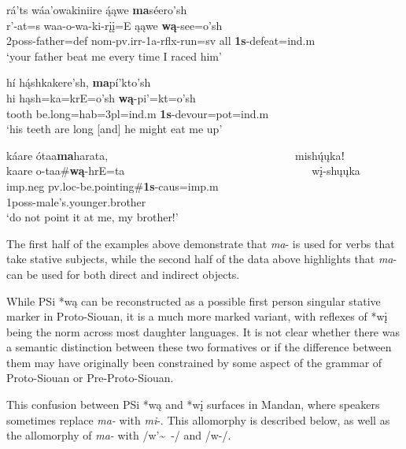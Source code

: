 \begin{exe}
\begin{xlist}
	\item \glll rá'ts wáa'owakiniire ą́ąwe \textbf{ma}séero'sh\\
	r'-at=s waa-o-wa-ki-rįį=E ąąwe \textbf{wą}-see=o'sh\\
	2poss-\textnormal{father}=def nom-pv.irr-1a-rflx-\textnormal{run}=sv \textnormal{all} \textbf{1s}-\textnormal{defeat}=ind.m\\
	\glt `your father beat me every time I raced him' \citep[124]{hollow1973a}
	
	\item \glll hí hą́shkakere'sh, \textbf{ma}pí'kto'sh\\
	hi hąsh=ka=krE=o'sh \textbf{wą}-pi'=kt=o'sh\\
	\textnormal{tooth} \textnormal{be.long}=hab=3pl=ind.m \textbf{1s}-\textnormal{devour}=pot=ind.m\\
	\glt `his teeth are long [and] he might eat me up' \citep[143]{hollow1973a}
	
	\item \glll káare ótaa\textbf{ma}harata, ~ ~ ~ ~ ~ ~ ~ ~ ~ ~ ~ ~ ~ ~ ~ ~ ~ ~ ~ ~ mishų́ųkaǃ\\
	kaare o-taa\#\textbf{wą}-hrE=ta ~ ~ ~ ~ ~ ~ ~ ~ ~ ~ ~ ~ ~ ~ ~ ~ ~ ~ ~ ~ wį-shųųka\\
	imp.neg pv.loc-\textnormal{be.pointing}\#\textbf{1s}-caus=imp.m ~ ~ ~ ~ ~ ~ ~ ~ ~ ~ ~ ~ ~ ~ ~ ~ ~ ~ ~ ~ 1poss-\textnormal{male's.younger.brother}\\
	\glt `do not point it at me, my brother!' \citep[167]{hollow1973a}
	\end{xlist}

\end{exe}

The first half of the examples above demonstrate that \textit{ma}- is used for verbs that take stative subjects, while the second half of the data above highlights that \textit{ma}- can be used for both direct and indirect objects. 

While PSi *wą can be reconstructed as a possible first person singular stative marker in Proto-Siouan, it is a much more marked variant, with reflexes of *wį being the norm across most daughter languages. It is not clear whether there was a semantic distinction between these two formatives or if the difference between them may have originally been constrained by some aspect of the grammar of Proto-Siouan or Pre-Proto-Siouan. 

This confusion between PSi *wą and *wį surfaces in Mandan, where speakers sometimes replace \textit{ma-} with \textit{mi}-. This allomorphy is described below, as well as the allomorphy of \textit{ma-} with /w'\~~-/ and /w-/.


